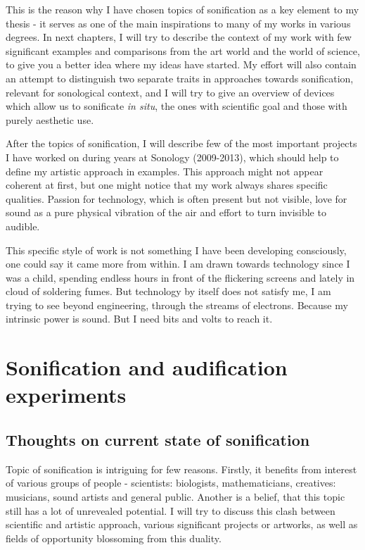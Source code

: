 \documentclass[12pt,a4paper,oneside]{report}
\begin{document}
This is the reason why I have chosen topics of sonification as a key element to my thesis - it serves as one of the main inspirations to many of my works in various degrees. In next chapters, I will try to describe the context of my work with few significant examples and comparisons from the art world and the world of science, to give you a better idea where my ideas have started. My effort will also contain an attempt to distinguish two separate traits in approaches towards sonification, relevant for sonological context, and I will try to give an overview of devices which allow us to sonificate \textit{in situ}, the ones with scientific goal and those with purely aesthetic use.

After the topics of sonification, I will describe few of the most important projects I have worked on during years at Sonology (2009-2013), which should help to define my artistic approach in examples. This approach might not appear coherent at first, but one might notice that my work always shares specific qualities. Passion for technology, which is often present but not visible, love for sound as a pure physical vibration of the air and effort to turn invisible to audible.

This specific style of work is not something I have been developing consciously, one could say it came more from within. I am drawn towards technology since I was a child, spending endless hours in front of the flickering screens and lately in cloud of soldering fumes. But technology by itself does not satisfy me, I am trying to see beyond engineering, through the streams of electrons. Because my intrinsic power is sound. But I need bits and volts to reach it.

\chapter{Sonification and audification experiments}

\section{Thoughts on current state of sonification}


Topic of sonification is intriguing for few reasons. Firstly, it benefits from interest of various groups of people - scientists: biologists, mathematicians, creatives: musicians, sound artists and general public. Another is a belief, that this topic still has a lot of unrevealed potential. I will try to discuss this clash between scientific and artistic approach, various significant projects or artworks, as well as fields of opportunity blossoming from this duality.
\end{document}
